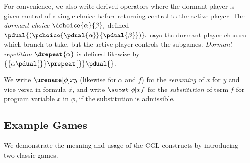 \documentclass[12pt]{cmuthesis}
\theoremstyle{definition}
\theoremstyle{remark}
\newcommand{\rref}[2][]{\prettyref{#2}}
\newcommand{\CGL}{\textsf{CGL}\xspace}
\begin{document}
For convenience, we also write derived operators where the dormant player is given control of a single choice before returning control to the active player.
The \emph{dormant choice} $\dchoice{\alpha}{\beta},$ defined $\pdual{({\pchoice{\pdual{\alpha}}{\pdual{\beta}}})},$ says the dormant player chooses which branch to take, but the active player controls the subgames.
\emph{Dormant repetition} $\drepeat{\alpha}$ is defined likewise by $\{\{\alpha\pdual{{}}\} \prepeat{{}}\} \pdual{{}}$.

We write $\eren{\phi}{x}{y}$ (likewise for $\alpha$ and $f$) for the \emph{renaming} of $x$ for $y$ and vice versa in formula $\phi$, and write $\tsub{\phi}{x}{f}$ for the \emph{substitution} of term $f$ for program variable $x$ in $\phi$, if the substitution is admissible.%


\subsection{Example Games}
\label{sec:example-games}
We demonstrate the meaning and usage of the \CGL constructs by introducing two classic games.
\end{document}
